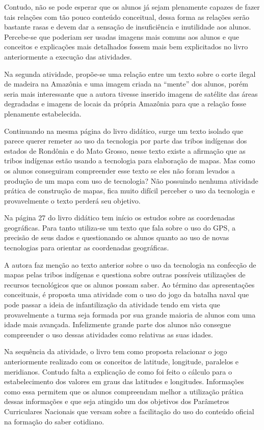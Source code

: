 \begin{refsection}
    Contudo, não se pode esperar que os alunos já sejam plenamente capazes de fazer tais relações com tão pouco conteúdo conceitual, dessa forma as relações serão bastante rasas e devem dar a sensação de insuficiência e inutilidade aos alunos. Percebe-se que poderiam ser usadas imagens mais comuns aos alunos e que conceitos e explicações mais detalhados fossem mais bem explicitados no livro anteriormente a execução das atividades.  

    Na segunda atividade, propõe-se uma relação entre um texto sobre o corte ilegal de madeira na Amazônia e uma imagem criada na “mente” dos alunos, porém seria mais interessante que a autora tivesse inserido imagens de satélite das áreas degradadas e imagens de locais da própria Amazônia para que a relação fosse plenamente estabelecida. 

    Continuando na mesma página do livro didático, surge um texto isolado que parece querer remeter ao uso da tecnologia por parte das tribos indígenas dos estados de Rondônia e do Mato Grosso, nesse texto existe a afirmação que as tribos indígenas estão usando a tecnologia para elaboração de mapas. Mas como os alunos conseguiram compreender esse texto se eles não foram levados a produção de um mapa com uso de tecnologia? Não possuindo nenhuma atividade prática de construção de mapas, fica muito difícil perceber o uso da tecnologia e provavelmente o texto perderá seu objetivo.   

    Na página 27 do livro didático tem início os estudos sobre as coordenadas geográficas. Para tanto utiliza-se um texto que fala sobre o uso do GPS, a precisão de seus dados e questionando os alunos quanto ao uso de novas tecnologias para orientar as coordenadas geográficas.  

    A autora faz menção ao texto anterior sobre o uso da tecnologia na confecção de mapas pelas tribos indígenas e questiona sobre outras possíveis utilizações de recursos tecnológicos que os alunos possam saber. Ao término das apresentações conceituais, é proposta uma atividade com o uso do jogo da batalha naval que pode passar a ideia de infantilização da atividade tendo em vista que provavelmente a turma seja formada por sua grande maioria de alunos com uma idade mais avançada. Infelizmente grande parte dos alunos não consegue compreender o uso dessas atividades como relativas as suas idades.  

    Na sequência da atividade, o livro tem como proposta relacionar o jogo anteriormente realizado com os conceitos de latitude, longitude, paralelos e meridianos. Contudo falta a explicação de como foi feito o cálculo para o estabelecimento dos valores em graus das latitudes e longitudes. Informações como essa permitem que os alunos compreendam melhor a utilização prática dessas informações e que seja atingido um dos objetivos dos Parâmetros Curriculares Nacionais que versam sobre a facilitação do uso do conteúdo oficial na formação do saber cotidiano. 


\end{refsection}
